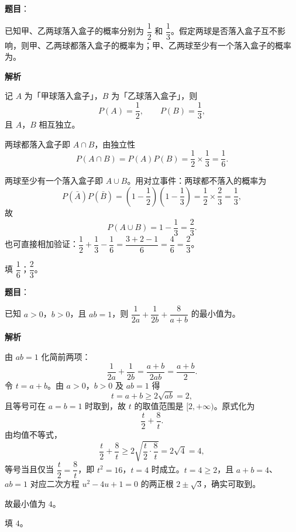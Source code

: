 \begin{answer}

\textbf{题目}：

已知甲、乙两球落入盒子的概率分别为 $\dfrac12$ 和 $\dfrac13$。假定两球是否落入盒子互不影响，则甲、乙两球都落入盒子的概率为\gkblank{}；甲、乙两球至少有一个落入盒子的概率为\gkblank{}。

\textbf{解析}

记 $A$ 为「甲球落入盒子」，$B$ 为「乙球落入盒子」，则
\nopagebreak[4]
\[P(A)=\frac12,\qquad P(B)=\frac13,\]
且 $A$，$B$ 相互独立。

两球都落入盒子即 $A\cap B$，由独立性
\nopagebreak[4]
\[P(A\cap B)=P(A)P(B)=\frac12\times\frac13=\frac16 .\]

两球至少有一个落入盒子即 $A\cup B$。用对立事件：两球都不落入的概率为
\nopagebreak[4]
\[P(\bar A)P(\bar B)=\left(1-\frac12\right)\left(1-\frac13\right)=\frac12\times\frac23=\frac13,\]
故
\nopagebreak[4]
\[P(A\cup B)=1-\frac13=\frac23 .\]
也可直接相加验证：$\dfrac12+\dfrac13-\dfrac16=\dfrac{3+2-1}6=\dfrac46=\dfrac23$。

填 $\dfrac16$；$\dfrac23$。


\end{answer}
\begin{answer}

\textbf{题目}：

已知 $a>0$，$b>0$，且 $ab=1$，则 $\dfrac{1}{2a}+\dfrac{1}{2b}+\dfrac{8}{a+b}$ 的最小值为\gkblank{}。

\textbf{解析}

由 $ab=1$ 化简前两项：
\nopagebreak[4]
\[\frac1{2a}+\frac1{2b}=\frac{a+b}{2ab}=\frac{a+b}2 .\]
令 $t=a+b$。由 $a>0$，$b>0$ 及 $ab=1$ 得
\nopagebreak[4]
\[t=a+b\geqslant2\sqrt{ab}=2,\]
且等号可在 $a=b=1$ 时取到，故 $t$ 的取值范围是 $[2,+\infty)$。原式化为
\nopagebreak[4]
\[\frac t2+\frac8t .\]
由均值不等式，
\nopagebreak[4]
\[\frac t2+\frac8t\geqslant2\sqrt{\frac t2\cdot\frac8t}=2\sqrt4=4,\]
等号当且仅当 $\dfrac t2=\dfrac8t$，即 $t^2=16$，$t=4$ 时成立。$t=4\geqslant2$，且 $a+b=4$、$ab=1$ 对应二次方程 $u^2-4u+1=0$ 的两正根 $2\pm\sqrt3$，确实可取到。

故最小值为 $4$。

填 $4$。


\end{answer}
